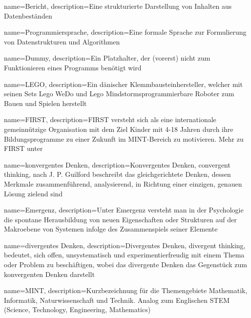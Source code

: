 
{
    name=Bericht,
    description={Eine strukturierte Darstellung von Inhalten aus Datenbeständen}
}

{
    name=Programmiersprache,
    description={Eine formale Sprache zur Formulierung von Datenstrukturen und Algorithmen}
}

{
    name=Dummy,
    description={Ein Platzhalter, der (vorerst) nicht zum Funktionieren eines Programms benötigt wird}
}

{
	name=LEGO\textsuperscript{\textregistered},
	description={Ein dänischer Klemmbausteinhersteller, welcher mit seinen Sets Lego WeDo und Lego Mindstorms\SymbReg programmierbare Roboter zum Bauen und Spielen herstellt}
}

{
	name=FIRST\textsuperscript{\textregistered},
	description={FIRST\textsuperscript{\textregistered} versteht sich als eine internationale gemeinnützige Organisation mit dem Ziel Kinder mit 4-18 Jahren durch ihre Bildungsprogramme zu einer Zukunft im \gls{MINT}-Bereich zu motivieren. Mehr zu FIRST\textsuperscript{\textregistered} unter \cite{aboutFirst}}
}

{
	name={konvergentes Denken},
	description={Konvergentes Denken, convergent thinking, nach J. P. Guilford beschreibt das gleichgerichtete Denken, dessen Merkmale zusammenführend, analysierend, in Richtung einer einzigen, genauen Lösung zielend sind \cite{convergentThinking}}
}

{
	name=Emergenz,
	description={Unter Emergenz versteht man in der Psychologie die spontane Herausbildung von neuen Eigenschaften oder Strukturen auf der Makroebene von Systemen infolge des Zusammenspiels seiner Elemente \cite{emergentThinking}}
}

{
	name={divergentes Denken},
	description={Divergentes Denken, divergent thinking, bedeutet, sich offen, unsystematisch und experimentierfreudig mit einem Thema oder Problem zu beschäftigen, wobei das divergente Denken  das Gegenstück zum konvergenten Denken darstellt \cite{divergentThinking}}
}

{
	name={MINT},
	description={Kurzbezeichnung für die Themengebiete Mathematik, Informatik, Naturwissenschaft und Technik. Analog zum Englischen STEM (Science, Technology, Engineering, Mathematics)}
}


